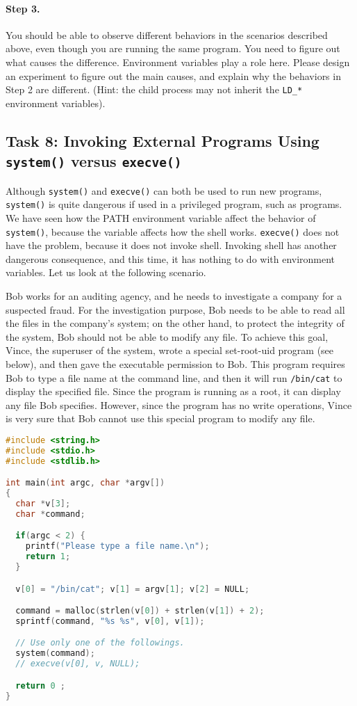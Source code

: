 \paragraph{Step 3.}
You should be able to observe different behaviors in the scenarios
described above, even though you are running the same program.  You need
to figure out what causes the difference. Environment variables
play a role here. Please design an experiment to figure out the
main causes, and explain why the behaviors in Step 2 are
different. (Hint: the child process
may not inherit the {\tt LD\_*} environment variables).



\subsection{Task 8: Invoking External Programs Using {\tt system()} versus {\tt execve()}}

Although {\tt system()} and {\tt execve()} can both be used to run new
programs, {\tt system()} is quite dangerous if used in a privileged
program, such as \setuid programs. We have seen how the PATH environment
variable affect the behavior of {\tt system()}, because the variable
affects how the shell works. {\tt execve()} does not have the problem,
because it does not invoke shell. Invoking shell has another dangerous
consequence, and this time, it has nothing to do with environment
variables.  Let us look at the following scenario.


Bob works for an auditing agency, and he needs to investigate a company for a suspected
fraud. For the investigation purpose, Bob needs to be able to read
all the files in the
company's \unix system; on the other hand, to protect the integrity of the system,
Bob should not be able to modify any file.
To achieve this goal, Vince, the superuser of the system,
wrote a special set-root-uid program (see
below), and then gave the executable permission to Bob. This program requires
Bob to type a file name at the command line, and then it will
run {\tt /bin/cat} to display the specified file. Since the program is running
as a root, it can display any file Bob specifies. However, since the program
has no write operations, Vince is very sure that Bob cannot use this special program
to modify any file.

\begin{lstlisting}[language=C]
#include <string.h>
#include <stdio.h>
#include <stdlib.h>

int main(int argc, char *argv[])
{
  char *v[3];
  char *command;

  if(argc < 2) {
    printf("Please type a file name.\n");
    return 1;
  }

  v[0] = "/bin/cat"; v[1] = argv[1]; v[2] = NULL;

  command = malloc(strlen(v[0]) + strlen(v[1]) + 2);
  sprintf(command, "%s %s", v[0], v[1]);

  // Use only one of the followings.
  system(command);
  // execve(v[0], v, NULL);

  return 0 ;
}
\end{lstlisting}



